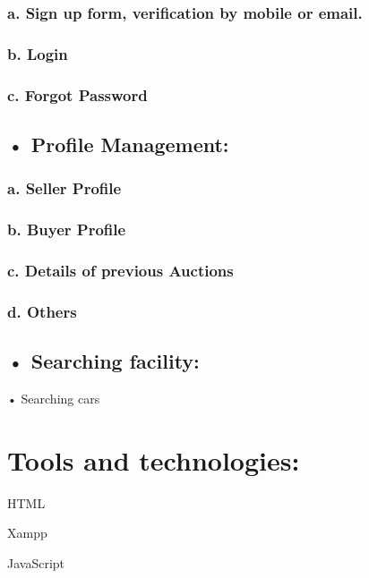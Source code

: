\documentclass{report}
\begin{document}
\subsubsection*{a. Sign up form, verification by mobile or email.}

\subsubsection*{b. Login}

\subsubsection*{c. Forgot Password}


\subsection*{• Profile Management:} 


\subsubsection*{a. Seller Profile}

\subsubsection*{b. Buyer Profile}

\subsubsection*{c. Details of previous Auctions}

\subsubsection*{d. Others}


\subsection*{• Searching facility:} 

• Searching cars

\section*{Tools and technologies:}

	HTML
	
	Xampp
	
	JavaScript
	
\end{document}
